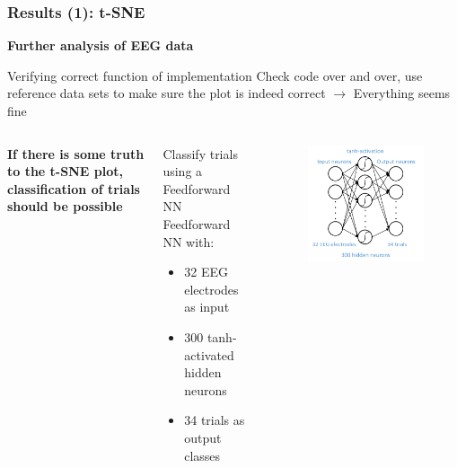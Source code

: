 \documentclass{beamer}
\begin{document}
\begin{frame}
	\frametitle{Results (1): t-SNE}
	\textbf{Further analysis of EEG data}
	\begin{block}{Verifying correct function of implementation}
		Check code over and over, use reference data sets to make sure the plot is indeed correct $\rightarrow$ Everything seems fine
	\end{block}
	
	\begin{columns}
		\textbf{If there is some truth to the t-SNE plot, classification of trials should be possible}
		\begin{block}{Classify trials using a Feedforward NN}
			Feedforward NN with:
			\begin{itemize}
				\item 32 EEG electrodes as input
				\item 300 tanh-activated hidden neurons
				\item 34 trials as output classes
			\end{itemize}
		\end{block}
		
		\begin{figure}[ht]
			\centering
			\includegraphics[width=1.0\textwidth, trim={0cm 0cm 0cm 0cm},clip]{images/FNN.pdf}
		\end{figure}	
	\end{columns}
\end{frame}
\end{document}
